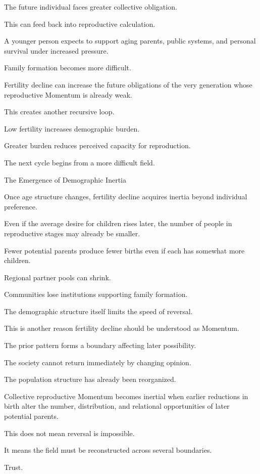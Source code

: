 The future individual faces greater collective obligation.

This can feed back into reproductive calculation.

A younger person expects to support aging parents, public systems, and personal survival under increased pressure.

Family formation becomes more difficult.

Fertility decline can increase the future obligations of the very generation whose reproductive Momentum is already weak.

This creates another recursive loop.

Low fertility increases demographic burden.

Greater burden reduces perceived capacity for reproduction.

The next cycle begins from a more difficult field.

The Emergence of Demographic Inertia

Once age structure changes, fertility decline acquires inertia beyond individual preference.

Even if the average desire for children rises later, the number of people in reproductive stages may already be smaller.

Fewer potential parents produce fewer births even if each has somewhat more children.

Regional partner pools can shrink.

Communities lose institutions supporting family formation.

The demographic structure itself limits the speed of reversal.

This is another reason fertility decline should be understood as Momentum.

The prior pattern forms a boundary affecting later possibility.

The society cannot return immediately by changing opinion.

The population structure has already been reorganized.

Collective reproductive Momentum becomes inertial when earlier reductions in birth alter the number, distribution, and relational opportunities of later potential parents.

This does not mean reversal is impossible.

It means the field must be reconstructed across several boundaries.

Trust.

